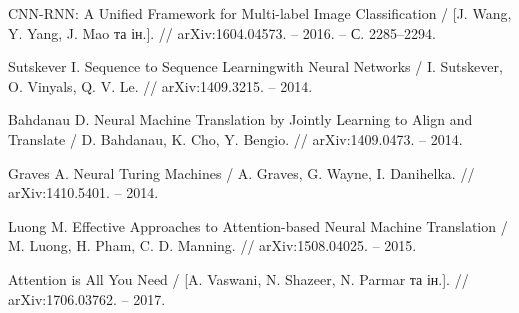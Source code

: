 \begin{thebibliography}{9}
    CNN-RNN: A Unified Framework for Multi-label Image Classification / [J. Wang, Y. Yang, J. Mao та ін.]. // arXiv:1604.04573. – 2016. – С. 2285–2294.

    Sutskever I. Sequence to Sequence Learningwith Neural Networks / I. Sutskever, O. Vinyals, Q. V. Le. // arXiv:1409.3215. – 2014.

    Bahdanau D. Neural Machine Translation by Jointly Learning to Align and Translate / D. Bahdanau, K. Cho, Y. Bengio. // arXiv:1409.0473. – 2014.

    Graves A. Neural Turing Machines / A. Graves, G. Wayne, I. Danihelka. // arXiv:1410.5401. – 2014.

    Luong M. Effective Approaches to Attention-based Neural Machine Translation / M. Luong, H. Pham, C. D. Manning. // arXiv:1508.04025. – 2015.

    Attention is All You Need / [A. Vaswani, N. Shazeer, N. Parmar та ін.]. // arXiv:1706.03762. – 2017.

\end{thebibliography}